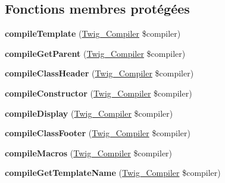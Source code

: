\subsection*{Fonctions membres protégées}
\begin{DoxyCompactItemize}
\item 
{\bfseries compile\+Template} (\hyperlink{class_twig___compiler}{Twig\+\_\+\+Compiler} \$compiler)\hypertarget{class_twig___node___module_a90bc59296bb0c90f305703bfd1d37566}{}\label{class_twig___node___module_a90bc59296bb0c90f305703bfd1d37566}

\item 
{\bfseries compile\+Get\+Parent} (\hyperlink{class_twig___compiler}{Twig\+\_\+\+Compiler} \$compiler)\hypertarget{class_twig___node___module_ab4896098ce341e82963cb3faddd833dd}{}\label{class_twig___node___module_ab4896098ce341e82963cb3faddd833dd}

\item 
{\bfseries compile\+Class\+Header} (\hyperlink{class_twig___compiler}{Twig\+\_\+\+Compiler} \$compiler)\hypertarget{class_twig___node___module_a0291e47aca499d273c3e735ef595c927}{}\label{class_twig___node___module_a0291e47aca499d273c3e735ef595c927}

\item 
{\bfseries compile\+Constructor} (\hyperlink{class_twig___compiler}{Twig\+\_\+\+Compiler} \$compiler)\hypertarget{class_twig___node___module_a2991abb5506b65360852de0145516048}{}\label{class_twig___node___module_a2991abb5506b65360852de0145516048}

\item 
{\bfseries compile\+Display} (\hyperlink{class_twig___compiler}{Twig\+\_\+\+Compiler} \$compiler)\hypertarget{class_twig___node___module_a448d9fcedb5f3c065b0ae27f2a111c7c}{}\label{class_twig___node___module_a448d9fcedb5f3c065b0ae27f2a111c7c}

\item 
{\bfseries compile\+Class\+Footer} (\hyperlink{class_twig___compiler}{Twig\+\_\+\+Compiler} \$compiler)\hypertarget{class_twig___node___module_a8f546f1b0d652a500c848b994c2cb221}{}\label{class_twig___node___module_a8f546f1b0d652a500c848b994c2cb221}

\item 
{\bfseries compile\+Macros} (\hyperlink{class_twig___compiler}{Twig\+\_\+\+Compiler} \$compiler)\hypertarget{class_twig___node___module_aabddf2e847a3a74a0611a09b237cbfaa}{}\label{class_twig___node___module_aabddf2e847a3a74a0611a09b237cbfaa}

\item 
{\bfseries compile\+Get\+Template\+Name} (\hyperlink{class_twig___compiler}{Twig\+\_\+\+Compiler} \$compiler)\hypertarget{class_twig___node___module_a1b94b0b10405ca45e004f560ea73d2ba}{}\label{class_twig___node___module_a1b94b0b10405ca45e004f560ea73d2ba}


\end{DoxyCompactItemize}
